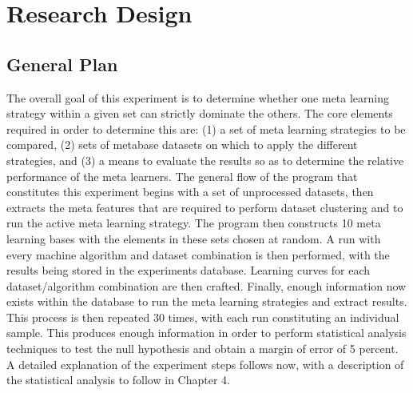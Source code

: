 \chapter{Research Design}
\label{Chapter3}
\section{General Plan}
The overall goal of this experiment is to determine whether one meta learning
strategy within a given set can strictly dominate the others. The core elements
required in order to determine this are: (1) a set of meta learning strategies to be
compared, (2) sets of metabase datasets on which to apply the different strategies,
and (3) a means to evaluate the results so as to determine the relative performance
of the meta learners. The general flow of the program that constitutes this
experiment begins with a set of unprocessed datasets, then extracts the
meta features that are required to perform dataset clustering and to
run the active meta learning strategy. The program then constructs 10
meta learning bases with the elements in these sets chosen at random. A run with
every machine algorithm and dataset combination is then performed, with the
results being stored in the experiments database. Learning curves for each
dataset/algorithm combination are then crafted. Finally, enough information now
exists within the database to run the meta learning strategies
and extract results. This process is then repeated 30 times, with each run
constituting an individual sample. This produces enough information in order
to perform statistical analysis techniques to test the null hypothesis and
obtain a margin of error of 5 percent. A detailed explanation of the experiment
steps follows now, with a description of the statistical analysis to follow in
Chapter 4.

